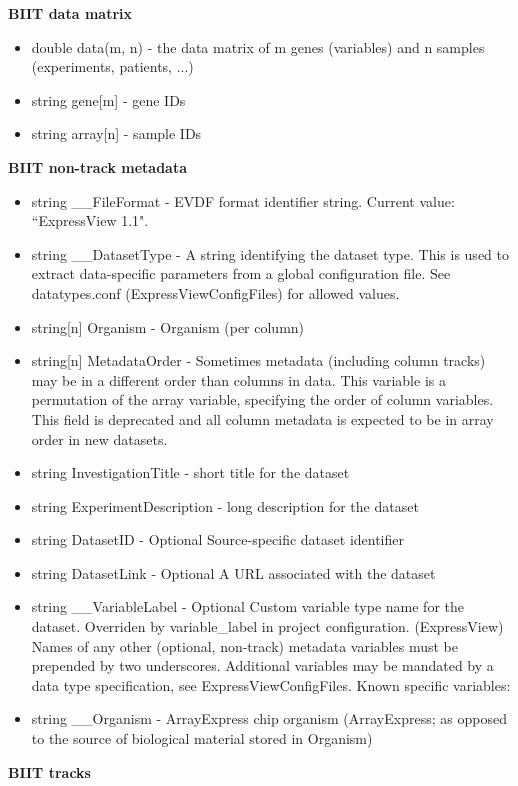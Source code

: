 \documentclass[12pt]{article}
\begin{document}
{\textbf{BIIT data matrix}
\begin{itemize}
  \item double data(m, n) - the data matrix of m genes (variables) and n samples (experiments, patients, ...)
  \item string gene[m] - gene IDs
  \item string array[n] - sample IDs
\end{itemize}

\textbf{BIIT non-track metadata}
\begin{itemize}
  \item string \_\_FileFormat - EVDF format identifier string. Current value: ``ExpressView 1.1".
  \item string \_\_DatasetType - A string identifying the dataset type. This is used to extract data-specific parameters from a global configuration file. See datatypes.conf (ExpressViewConfigFiles) for allowed values.
  \item string[n] Organism - Organism (per column)
  \item string[n] MetadataOrder - Sometimes metadata (including column tracks) may be in a different order than columns in data. This variable is a permutation of the array variable, specifying the order of column variables. This field is deprecated and all column metadata is expected to be in array order in new datasets.
  \item string InvestigationTitle - short title for the dataset
  \item string ExperimentDescription - long description for the dataset
  \item string DatasetID - Optional Source-specific dataset identifier
  \item string DatasetLink - Optional A URL associated with the dataset
  \item string \_\_VariableLabel - Optional Custom variable type name for the dataset. Overriden by variable\_label in project configuration. (ExpressView)
Names of any other (optional, non-track) metadata variables must be prepended by two underscores. Additional variables may be mandated by a data type specification, see ExpressViewConfigFiles. Known specific variables:
  \item string \_\_Organism - ArrayExpress chip organism (ArrayExpress; as opposed to the source of biological material stored in Organism)
\end{itemize}

\textbf{BIIT tracks}

}
\end{document}
